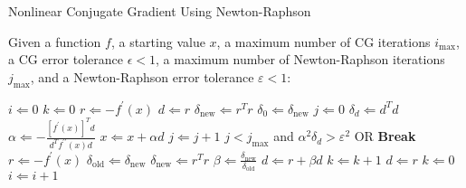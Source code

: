 \begin{algorithm}
	\caption{Nonlinear Conjugate Gradient Using Newton-Raphson \cite{Shewchuk1994}\label{CongGradAlg}}
	Given a function $f$, a starting value $x$, a maximum number of CG iterations $i_{\text{max}}$, a CG error tolerance $\epsilon<1$, a maximum number of Newton-Raphson iterations $j_{\text{max}}$, and a Newton-Raphson error tolerance $\varepsilon<1$:
	\begin{algorithmic}
		\State $i\Leftarrow 0$
		\State $k\Leftarrow 0$
		\State $r\Leftarrow -f^{\prime}(x)$
		\State $d\Leftarrow r$
		\State $\delta_{\text{new}}\Leftarrow r^Tr$
		\State $\delta_0\Leftarrow\delta_{\text{new}}$
		\State $j\Leftarrow 0$
		\State $\delta_d\Leftarrow d^Td$
		\State $\alpha\Leftarrow -\frac{\left[f^{\prime}(x)\right]^Td}{d^Tf^{\prime\prime}(x)d}$
		\State $x\Leftarrow x+\alpha d$
		\State $j\Leftarrow j+1$
		\State $j<j_{\text{max}}$ and $\alpha^2\delta_d>\varepsilon^2$ OR \textbf{Break}
		\EndWhile
		\State $r\Leftarrow -f^{\prime}(x)$
		\State $\delta_{\text{old}}\Leftarrow\delta_{\text{new}}$
		\State $\delta_{\text{new}}\Leftarrow r^T r$
		\State $\beta\Leftarrow\frac{\delta_{\text{new}}}{\delta_{\text{old}}}$
		\State $d\Leftarrow r+\beta d$
		\State $k\Leftarrow k+1$
		\State $d\Leftarrow r$
		\State $k\Leftarrow 0$
		\EndIf
		\State $i\Leftarrow i+1$
		\EndWhile
	\end{algorithmic}
\end{algorithm}




